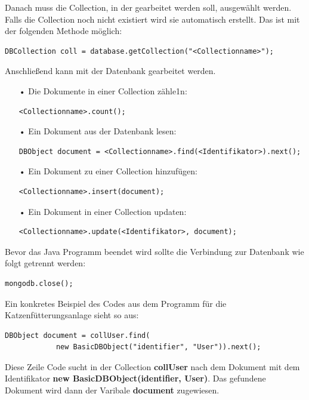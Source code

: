 Danach muss die Collection, in der gearbeitet werden soll, ausgewählt werden. Falls die Collection noch nicht existiert wird sie automatisch erstellt. Das ist mit der folgenden Methode möglich:
\begin{lstlisting}[style=JavaStyle, caption=Collection auswählen]
	DBCollection coll = database.getCollection("<Collectionname>");
\end{lstlisting}
Anschließend kann mit der Datenbank gearbeitet werden. 
\begin{itemize}
\item[•] Die Dokumente in einer Collection zähle1n:
\begin{lstlisting}[style=JavaStyle, caption=Anzahl der Collections zählen]
	<Collectionname>.count();
\end{lstlisting}
\item[•] Ein Dokument aus der Datenbank lesen:
\begin{lstlisting}[style=JavaStyle, caption=Nach Dokument suchen]
	DBObject document = <Collectionname>.find(<Identifikator>).next();
\end{lstlisting}
\item[•] Ein Dokument zu einer Collection hinzufügen:
\begin{lstlisting}[style=JavaStyle, caption=Ein Dokument hinzufügen]
	<Collectionname>.insert(document);
\end{lstlisting}	
\item[•] Ein Dokument in einer Collection updaten:
\begin{lstlisting}[style=JavaStyle, caption=Ein Dokument updaten]
	<Collectionname>.update(<Identifikator>, document);
\end{lstlisting}
\end{itemize}

Bevor das Java Programm beendet wird sollte die Verbindung zur Datenbank wie folgt getrennt werden: 
\begin{lstlisting}[style=JavaStyle, caption=Verbindung zur Datenbank trennen]
	mongodb.close();
\end{lstlisting}

Ein konkretes Beispiel des Codes aus dem Programm für die Katzenfütterungsanlage sieht so aus:
\begin{lstlisting}[style=JavaStyle, caption=Konkretes Beispiel: Dokument suchen]
	DBObject document = collUser.find(
			new BasicDBObject("identifier", "User")).next();
\end{lstlisting}
Diese Zeile Code sucht in der Collection \textbf{collUser} nach dem Dokument mit dem Identifikator \textbf{new BasicDBObject(\grqq{}identifier\grqq{}, \grqq{}User\grqq{})}. Das gefundene Dokument wird dann der Varibale \textbf{document} zugewiesen. 


